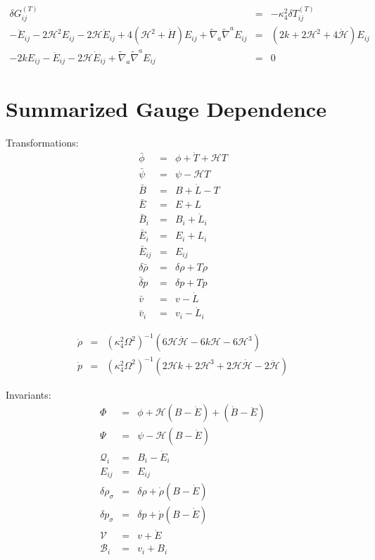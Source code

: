 \documentclass[10pt,letterpaper]{article}
\numberwithin{equation}{section}
\begin{document}
\begin{appendices}
\begin{eqnarray}
\delta  G^{(T)}_{ij}&=& -\kappa^2_4 \delta T^{(T)}_{ij}
\nonumber\\
- \ddot{E}_{ij}
 - 2 \mathcal H^2 E_{ij} 
 - 2 \mathcal H \dot{E}_{ij}
 + 4(\mathcal H^2 +\dot H) E_{ij}
 + \tilde\nabla_{a}\tilde\nabla^{a}E_{ij}
&=&
 (2k+2\mathcal H^2 + 4\dot{\mathcal H})E_{ij}
\nonumber\\
-2k E_{ij} - \ddot{E}_{ij}- 2 \mathcal H \dot{E}_{ij} + \tilde\nabla_{a}\tilde\nabla^{a}E_{ij}
&=&
0
\end{eqnarray}

\section{Summarized Gauge Dependence}
Transformations:
\begin{eqnarray}
\bar \phi &=& \phi  + \dot T + \mathcal H T
\nonumber\\
\bar \psi &=& \psi  - \mathcal H T
\nonumber\\
\bar B &=& B + \dot L - T
\nonumber\\
\bar E &=& E + L
\nonumber\\
\bar B_i &=& B_i + \dot L_i
\nonumber\\
\bar E_i &=& E_i + L_i
\nonumber\\
\bar E_{ij} &=& E_{ij}
\nonumber\\
\delta \bar \rho &=& \delta \rho + T\dot \rho 
\nonumber\\
\bar \delta p &=& \delta p + T\dot p
\nonumber\\
\bar v&=& v-\dot L
\nonumber\\
\bar v_i &=& v_i - \dot L_i
\end{eqnarray}

\begin{eqnarray}
\dot \rho &=& (\kappa_4^2 \Omega^2)^{-1}( 6\mathcal H \dot{\mathcal H} - 6k\mathcal H - 6\mathcal H^3)
\nonumber\\
 \dot p &=&(\kappa_4^2 \Omega^2)^{-1} (2\mathcal H k + 2\mathcal{H}^3+2\mathcal H \dot{\mathcal H} - 2\ddot{\mathcal H})
\end{eqnarray}

Invariants:
\begin{eqnarray}
\Phi &=& \phi +\mathcal H (B-\dot E) + (\dot B-\ddot E)
\nonumber\\
\Psi &=& \psi - \mathcal H(B-\dot E)
\nonumber\\
\mathcal Q_i &=& B_i - \dot E_i
\nonumber\\
E_{ij} &=& E_{ij}
\nonumber\\
\delta \rho_\sigma &=& \delta \rho + \dot \rho (B-\dot E)
\nonumber\\
\delta p_\sigma &=& \delta p + \dot p (B-\dot E)
\nonumber\\
\mathcal V &=& v+\dot E
\nonumber\\
\mathcal B_i &=& v_i + B_i
\end{eqnarray}

\end{appendices}
\end{document}
